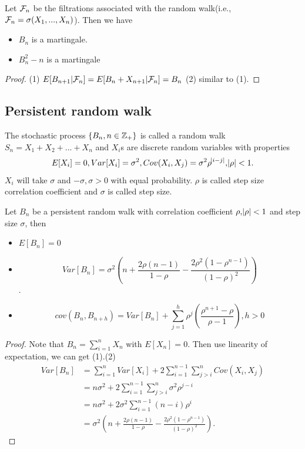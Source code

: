 \begin{refsection}
\begin{lemma}\label{ch:theory-of-stochastic-process:th:randomwalkmartingaleproperty}
Let $\mathcal{F}_n$ be the filtrations associated with the random walk(i.e., $\mathcal{F}_n = \sigma(X_1,...,X_n)$). Then we have
\begin{itemize}
	\item $B_n$ is a martingale.
	\item $B_n^2 - n$ is a martingale
\end{itemize}
\end{lemma}
\begin{proof}
(1) $E[B_{n+1}|\mathcal{F}_n] = E[B_n + X_{n+1}|\mathcal{F}_n] = B_n$
(2)	similar to (1).
\end{proof}


\subsection{Persistent random walk}

\begin{definition}
	The stochastic process $\{B_n,n\in \mathbb{Z}_+\}$ is called a random walk $S_n = X_1 + X_2 + ... + X_n$ and $X_i$s are discrete random variables with properties
	$$E[X_i] = 0, Var[X_i] = \sigma^2, Cov(X_i,X_j) = \sigma^2\rho^{\abs{i-j}}, \abs{\rho}<1.$$
	$X_i$ will take $\sigma$ and $-\sigma, \sigma > 0$ with equal probability. $\rho$ is called step size correlation coefficient and $\sigma$ is called step size.
\end{definition}

\begin{lemma}\label{ch:theory-of-stochastic-process:persistentRandomWalkBasicProperty}
	Let $B_n$ be a persistent random walk with correlation coefficient $\rho,\abs{\rho} < 1$ and step size $\sigma$, then
	\begin{itemize}
		\item $E[B_n]  =0 $
		\item $$Var[B_n] = \sigma^2(n + \frac{2\rho(n-1)}{1-\rho} - \frac{2\rho^2(1-\rho^{n-1})}{(1-\rho)^2})$$.
		\item $$cov(B_n,B_{n+h}) = Var[B_n] + \sum_{j=1}^h \rho^j (\frac{\rho^{n+1} - \rho}{\rho - 1}), h > 0$$
	\end{itemize}
\end{lemma}
\begin{proof}
Note that $B_n = \sum_{i=1}^n X_n$ with $E[X_n] = 0$. Then use linearity of expectation, we can get (1).(2)
\begin{align*}
Var[B_n] &= \sum_{i=1}^n Var[X_i] + 2\sum_{i=1}^{n-1}\sum_{j>i}^n Cov(X_i,X_j) \\
&= n\sigma^2 + 2\sum_{i=1}^{n-1}\sum_{j>i}^n \sigma^2\rho^{j-i} \\
&= n\sigma^2 + 2\sigma^2\sum_{i=1}^{n-1} (n-i)\rho^{i} \\
&=\sigma^2(n + \frac{2\rho(n-1)}{1-\rho} - \frac{2\rho^2(1-\rho^{n-1})}{(1-\rho)^2}).
\end{align*}


\end{proof}
\end{refsection}
